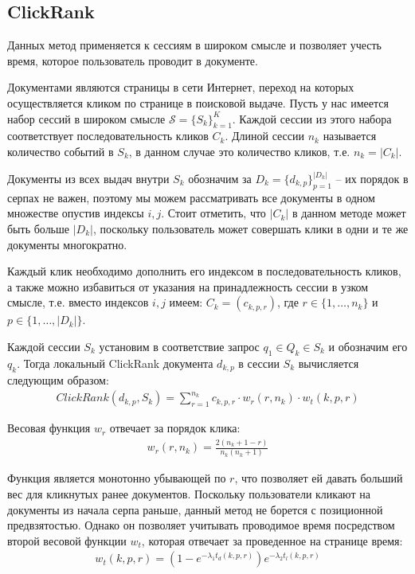 \documentclass[diploma]{nanolab2015}
\begin{document}
\subsection{ClickRank}
Данных метод применяется к сессиям в широком смысле и позволяет учесть время, которое пользователь проводит в документе.

Документами являются страницы в сети Интернет, переход на которых осуществляется кликом по странице в поисковой выдаче.
Пусть у нас имеется набор сессий в широком смысле $\mathcal{S} = \{S_k\}_{k=1}^K$. Каждой сессии из этого набора соответствует последовательность кликов $C_k$. Длиной сессии $n_k$ называется количество событий в $S_k$, в данном случае это количество кликов, т.е. $n_k = |C_k|$.

Документы из всех выдач внутри $S_k$ обозначим за $D_k = \{d_{k,p}\}_{p=1}^{|D_k|}$ -- их порядок в серпах не важен, поэтому мы можем рассматривать все документы в одном множестве опустив индексы $i,j$.
Стоит отметить, что $|C_k|$ в данном методе может быть больше $|D_k|$, поскольку пользователь может совершать клики в одни и те же документы многократно.

Каждый клик необходимо дополнить его индексом в последовательность кликов, а также можно избавиться от указания на принадлежность сессии в узком смысле, т.е. вместо индексов $i,j$ имеем: $C_k = (c_{k,p,r})$, где $r \in \{1, \dots, n_k\}$ и $p \in \{1, \dots, |D_k|\}$.

Каждой сессии $S_k$ установим в соответствие запрос $q_1 \in Q_k \in S_k$ и обозначим его $q_k$. Тогда локальный ClickRank \cite{clickrank} документа $d_{k,p}$ в сессии $S_k$ вычисляется следующим образом:
\begin{align}
    ClickRank(d_{k,p}, S_k) = \sum_{r=1}^{n_k} c_{k, p, r} \cdot w_r(r, n_k) \cdot w_t(k,p,r)
\end{align}

Весовая функция $w_r$ отвечает за порядок клика:
\begin{align}
    w_r(r, n_k) = \frac{2(n_k + 1 - r)}{n_k(n_k + 1)}
\end{align}

Функция является монотонно убывающей по $r$, что позволяет ей давать больший вес для кликнутых ранее документов. Поскольку пользователи кликают на документы из начала серпа раньше, данный метод не борется с позиционной предвзятостью. Однако он позволяет учитывать проводимое время посредством второй весовой функции $w_t$, которая отвечает за проведенное на странице время:
\begin{align}
    w_t(k,p,r) = (1 - e^{-\lambda_1 t_d(k,p,r)})e^{-\lambda_2 t_l(k,p,r)}
\end{align}
\end{document}
